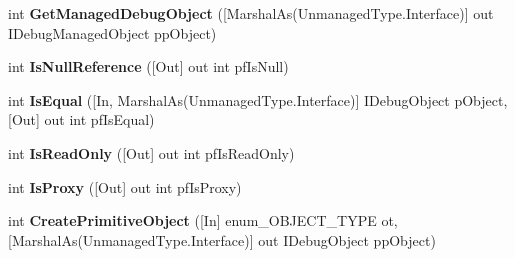 \begin{DoxyCompactItemize}
\item 
\hypertarget{interface_microsoft_1_1_visual_studio_1_1_debugger_1_1_interop_e_e_1_1_i_debug_function_object_aaa1c79205eed3c24b015d4357142f4de}{int {\bfseries Get\+Managed\+Debug\+Object} (\mbox{[}Marshal\+As(Unmanaged\+Type.\+Interface)\mbox{]} out I\+Debug\+Managed\+Object pp\+Object)}\label{interface_microsoft_1_1_visual_studio_1_1_debugger_1_1_interop_e_e_1_1_i_debug_function_object_aaa1c79205eed3c24b015d4357142f4de}

\item 
\hypertarget{interface_microsoft_1_1_visual_studio_1_1_debugger_1_1_interop_e_e_1_1_i_debug_function_object_a88481ef9495b56956b5dc6173b462e90}{int {\bfseries Is\+Null\+Reference} (\mbox{[}Out\mbox{]} out int pf\+Is\+Null)}\label{interface_microsoft_1_1_visual_studio_1_1_debugger_1_1_interop_e_e_1_1_i_debug_function_object_a88481ef9495b56956b5dc6173b462e90}

\item 
\hypertarget{interface_microsoft_1_1_visual_studio_1_1_debugger_1_1_interop_e_e_1_1_i_debug_function_object_a593307385fb6e824712c15e0ebc8b71b}{int {\bfseries Is\+Equal} (\mbox{[}In, Marshal\+As(Unmanaged\+Type.\+Interface)\mbox{]} I\+Debug\+Object p\+Object, \mbox{[}Out\mbox{]} out int pf\+Is\+Equal)}\label{interface_microsoft_1_1_visual_studio_1_1_debugger_1_1_interop_e_e_1_1_i_debug_function_object_a593307385fb6e824712c15e0ebc8b71b}

\item 
\hypertarget{interface_microsoft_1_1_visual_studio_1_1_debugger_1_1_interop_e_e_1_1_i_debug_function_object_aa20a41b678a4645e96391d315ee8d6b8}{int {\bfseries Is\+Read\+Only} (\mbox{[}Out\mbox{]} out int pf\+Is\+Read\+Only)}\label{interface_microsoft_1_1_visual_studio_1_1_debugger_1_1_interop_e_e_1_1_i_debug_function_object_aa20a41b678a4645e96391d315ee8d6b8}

\item 
\hypertarget{interface_microsoft_1_1_visual_studio_1_1_debugger_1_1_interop_e_e_1_1_i_debug_function_object_a290600f4883ca48ad7f8d1d59815ad33}{int {\bfseries Is\+Proxy} (\mbox{[}Out\mbox{]} out int pf\+Is\+Proxy)}\label{interface_microsoft_1_1_visual_studio_1_1_debugger_1_1_interop_e_e_1_1_i_debug_function_object_a290600f4883ca48ad7f8d1d59815ad33}

\item 
\hypertarget{interface_microsoft_1_1_visual_studio_1_1_debugger_1_1_interop_e_e_1_1_i_debug_function_object_a26852b7c256d94b806bd26f5d1238c56}{int {\bfseries Create\+Primitive\+Object} (\mbox{[}In\mbox{]} enum\+\_\+\+O\+B\+J\+E\+C\+T\+\_\+\+T\+Y\+P\+E ot, \mbox{[}Marshal\+As(Unmanaged\+Type.\+Interface)\mbox{]} out I\+Debug\+Object pp\+Object)}\label{interface_microsoft_1_1_visual_studio_1_1_debugger_1_1_interop_e_e_1_1_i_debug_function_object_a26852b7c256d94b806bd26f5d1238c56}


\end{DoxyCompactItemize}
